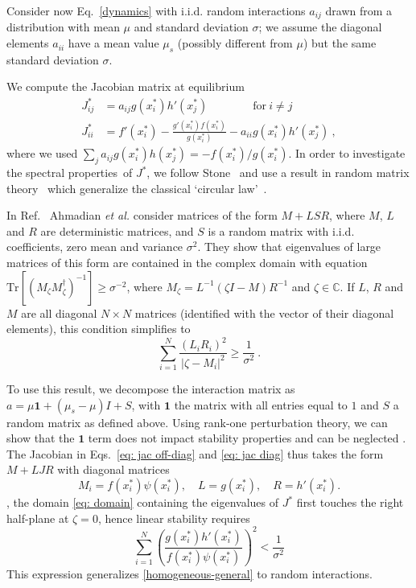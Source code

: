 Consider now Eq.~\eqref{dynamics} with i.i.d. random interactions $a_{ij}$ drawn from a distribution with mean $\mu$ and standard deviation $\sigma$; we assume the diagonal elements $a_{ii}$ have a mean value $\mu_s$ (possibly different from $\mu$) but the same standard deviation $\sigma$.
 
We compute the Jacobian matrix at equilibrium
\begin{align}
    J_{ij}^* & = a_{ij}g(x_i^*)h'(x_j^*) \qquad \qquad \textrm{for} \ i\neq j \label{eq: jac off-diag}\\
    J_{ii}^* & = f'(x_i^*) - \frac{g'(x_i^*)f(x_i^*)}{g(x_i^*)} - a_{ii}g(x_i^*)h'(x_j^*) \ , \label{eq: jac diag}
\end{align}
where we used $\sum_{j}a_{ij}g(x_i^*)h(x_j^*)=-f(x_i^*)/g(x_i^*)$.
In order to investigate the spectral properties of $J^*$, 
we follow Stone~\cite{Stone2018} and use a result in random matrix theory~\cite{Ahmadian2015} which generalize the classical `circular law'~\cite{Potters2020}.

In Ref.~\cite{Ahmadian2015} Ahmadian \emph{et al.} consider matrices of the form $M + LSR$, where $M$,  
$L$ and $R$ are deterministic matrices, and $S$ is a random matrix with i.i.d. coefficients, zero mean and variance $\sigma^2$.
They show that eigenvalues of large matrices of this form are contained in the complex domain with equation
$\textrm{Tr}[(M_\zeta M_\zeta^\dagger)^{-1}]\geq \sigma^{-2}$, where $M_\zeta = L^{-1}(\zeta I - M)R^{-1}$ and $\zeta\in\mathbb{C}$.
If $L$, $R$ and $M$ are all diagonal $N\times N$ matrices (identified with the vector of their diagonal elements), this condition simplifies to
\begin{equation}
    \sum_{i=1}^N\frac{(L_{i}R_{i})^2}{ \vert \zeta - M_{i}\vert^2 }\geq \frac{1}{\sigma^{2}} \ .
\label{eq: domain}
\end{equation}

To use this result, we decompose the interaction matrix as $a = \mu \mathbf{1} + (\mu_s-\mu)I + S$,
with $\mathbf{1}$ the matrix with all entries equal to $1$ and $S$ a random matrix as defined above.
Using rank-one perturbation theory, we can show that the $\mathbf{1}$ term does not impact stability properties and can be neglected \cite{Stone2018}.
The Jacobian in Eqs.~\eqref{eq: jac off-diag} and \eqref{eq: jac diag} thus takes the form $M + LJR$ with diagonal matrices
\begin{equation}
    M_i = f(x_i^*)\psi(x_i^*),\quad L = g(x_i^*), \quad R = h'(x_i^*).
\end{equation}
, the domain \eqref{eq: domain} containing the eigenvalues of $J^*$ first touches the right half-plane at $\zeta = 0$, 
hence linear stability requires
\begin{equation}
    \sum_{i=1}^N \left(\frac{g(x_i^*)h'(x_i^*)}{f(x_i^*)\psi(x_i^*)}\right)^2
    < \frac{1}{\sigma^{2}}
    \label{eq: random-stability}
\end{equation}
This expression generalizes \eqref{homogeneous-general} to random interactions. 

